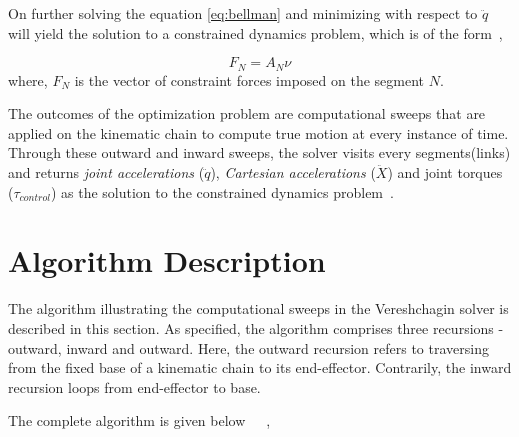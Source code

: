  On further solving the equation \ref{eq:bellman} and minimizing with respect to $\ddot{q}$ will yield the solution to a constrained dynamics problem, which is of the form~\cite{shakhimardanov2015composable}, 
 
  \begin{equation}\label{eq:solution}
  F_N = A_N \nu
  \end{equation}
where, $F_N$ is the vector of constraint forces imposed on the segment $N$.


The outcomes of the optimization problem are computational sweeps that are applied on the kinematic chain to compute true motion at every instance of time. Through these outward and inward sweeps, the solver visits every segments(links) and returns \textit{joint accelerations} ($\ddot{q}$), \textit{Cartesian accelerations} ($\ddot{X}$) and joint torques ($\tau_{control}$) as the solution to the constrained dynamics problem~\cite{shakhimardanov2015composable}. 

\section{Algorithm Description}

The algorithm illustrating the computational sweeps in the Vereshchagin solver is described in this section. As specified, the algorithm comprises three recursions - outward, inward and outward. Here, the outward recursion refers to traversing from the fixed base of a kinematic chain to its end-effector. Contrarily, the inward recursion loops from end-effector to base. 

	The complete algorithm is given below~\cite{shakhimardanov2015composable}~\cite{vereshchagin1989modeling}~\cite{vukcevic2018extending},

